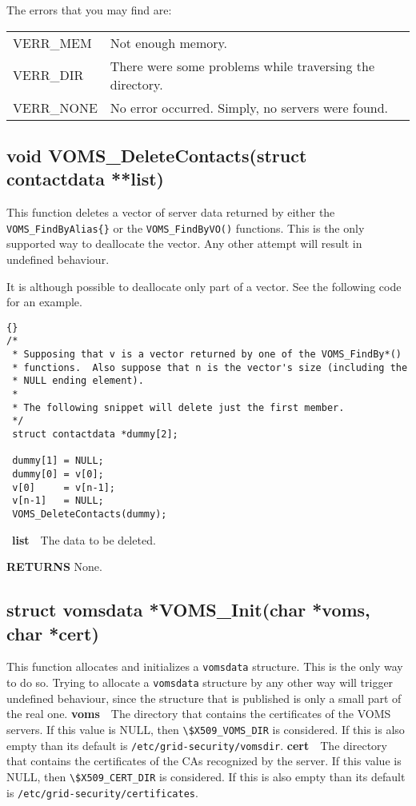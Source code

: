 \documentclass[a4paper]{book}
\newcommand{\return}{\noindent \textbf{RETURNS}\newline}
\newcommand{\parameter}[1]{\newline\textbf{#1}\ \ }
\begin{document}
The errors that you may find are:

\bigskip\begin{tabular}{lp{3in}}
VERR\_MEM  & Not enough memory.\\
VERR\_DIR  & There were some problems while traversing the directory.\\
VERR\_NONE & No error occurred. Simply, no servers were found.\\
\end{tabular}

\subsection{void VOMS\_DeleteContacts(struct contactdata **list)}

This function deletes a vector of server data returned by either the
\verb|VOMS_FindByAlias{}| or the \verb|VOMS_FindByVO()| functions.
This is the only supported way to deallocate the vector.  Any other
attempt will result in undefined behaviour.

It is although possible to deallocate only part of a vector.  See the
following code for an example.

\begin{lstlisting}{}
/*
 * Supposing that v is a vector returned by one of the VOMS_FindBy*()
 * functions.  Also suppose that n is the vector's size (including the
 * NULL ending element).
 *
 * The following snippet will delete just the first member.
 */
 struct contactdata *dummy[2];

 dummy[1] = NULL;
 dummy[0] = v[0];
 v[0]     = v[n-1];
 v[n-1]   = NULL;
 VOMS_DeleteContacts(dummy);
\end{lstlisting}

\ \parameter{list}{The data to be deleted.}

\return
None.

\subsection{struct vomsdata *VOMS\_Init(char *voms, char *cert)}

This function allocates and initializes a \verb|vomsdata| structure.
This is the only way to do so.  Trying to allocate a \verb|vomsdata|
structure by any other way will trigger undefined behaviour, since the
structure that is published is only a small part of the real one.
\parameter{voms}{The directory that contains the certificates of the
  VOMS servers.  If this value is NULL, then \verb|\$X509_VOMS_DIR| is
  considered.  If this is also empty than its default is
  \verb|/etc/grid-security/vomsdir|.}
\parameter{cert}{The directory that contains the certificates of the
  CAs recognized by the server.  If this value is NULL, then
  \verb|\$X509_CERT_DIR| is considered.  If this is also empty than its
  default is \verb|/etc/grid-security/certificates|.}
\end{document}
